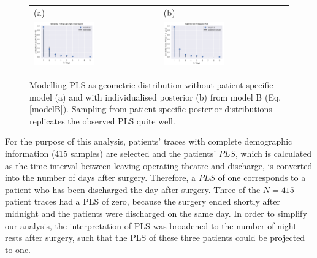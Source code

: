 \begin{figure}
  \centering
  \begin{tabular}{ll}
    (a) & (b) \\
    \includegraphics[width=0.5\textwidth]{images/DS19eH1_G0__empirical_geometric.pdf}
    &
    \includegraphics[width=0.5\textwidth]{images/DS19fk1_c0__sampled_posterior.pdf}\\
  \end{tabular}
    \caption{Modelling PLS as geometric distribution without patient
      specific model (a) and with individualised posterior (b) from
      model B (Eq. \eqref{modelB}). Sampling from patient specific
      posterior distributions replicates the observed PLS quite well.
      }
    \label{fig:Geom}
\end{figure}

For the purpose of this analysis, patients' traces with complete
demographic information (415 samples) are selected and
the patients' $PLS$, which is
calculated as the time interval between leaving operating theatre and discharge, is
converted into the number of days after surgery. Therefore, a $PLS$ of
one corresponds to a patient who has been discharged the day after
surgery. Three of the $N=415$  %
patient traces had a PLS of zero, because the surgery ended shortly after midnight and the patients were discharged on the same day. In order to simplify our analysis, the interpretation of PLS was broadened to the number of night rests after surgery, such that the PLS of these three patients could be projected to one.

